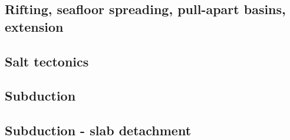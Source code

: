 \subsection*{Rifting, seafloor spreading, pull-apart basins, extension}

\cite{hoen86b}
\cite{trbr91}
\cite{zieg92b}
\cite{dusa96}
\cite{rafm98}
\cite{hupc01}
\cite{hube02}\cite{hani02}\cite{dabm02}
\cite{hube03}\cite{hani03}
\cite{hier04}
\cite{hubb05}
\cite{tibs06}
\cite{huha07}
\cite{agcz09}
\cite{aubh10}
\cite{alht11}
\cite{alht12}
\cite{alhf13}
\cite{hebr14}\cite{lige14}
\cite{nabu15}
\cite{olbm16}\cite{jekm16}
\cite{lemh17}
\cite{lisp19}

\subsection*{Salt tectonics}

\cite{tars91}
\cite{zaju92}
\cite{nabr93}
\cite{istt04}
\cite{huja07}

\subsection*{Subduction}

\cite{thar85}
\cite{jarr86}
\cite{boww89}
\cite{hstt90}
\cite{zhgu92}\cite{whbw92}
\cite{jope93}\cite{dvnm93}
\cite{zhgu94}\cite{wibe94}\cite{wdbo94a}\cite{wdbo94b}
\cite{hajc97}
\cite{itki98}
\cite{hagu99}
\cite{tesc00}
\cite{refm03}
\cite{toba04}
\cite{jalo05}\cite{lahb05}
\cite{degw06}\cite{rohu06}
\cite{artd07}\cite{yaab07}
\cite{yaba08}\cite{ozrs08}\cite{dihf08}\cite{wabj08}\cite{wabj08b}
\cite{yahb09}
\cite{hagr10}\cite{lobh10}
\cite{lixg11}\cite{list11}
\cite{anwb12}\cite{jahu12}\cite{jabi12}\cite{jabk12}\cite{lixg12}\cite{lixg13}\cite{ronb12}\cite{tebu12}
\cite{thka12}
\cite{nabg13}\cite{hage13}\cite{ancv13}\cite{namu13}\cite{yosh13}\cite{zhgt13}\cite{jabr13}\cite{izht13}
\cite{luws13}\cite{dusc13}\cite{tibb13}
\cite{robn14}\cite{hond14}\cite{ronc14}
\cite{tomy16}

\subsection*{Subduction - slab detachment}


